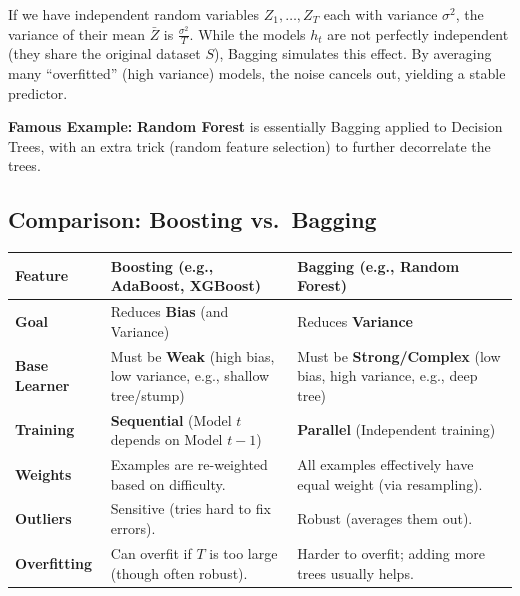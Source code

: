 \documentclass[
  italian,
  11pt,
]{article}
\newcounter{none} %
\begin{document}
If we have independent random variables \(Z_1, \dots, Z_T\) each with
variance \(\sigma^2\), the variance of their mean \(\bar{Z}\) is
\(\frac{\sigma^2}{T}\). While the models \(h_t\) are not perfectly
independent (they share the original dataset \(S\)), Bagging simulates
this effect. By averaging many ``overfitted'' (high variance) models,
the noise cancels out, yielding a stable predictor.

\textbf{Famous Example:} \textbf{Random Forest} is essentially Bagging
applied to Decision Trees, with an extra trick (random feature
selection) to further decorrelate the trees.

\subsection{Comparison: Boosting
vs.~Bagging}\label{comparison-boosting-vs.-bagging}

{\def\LTcaptype{none} %
\begin{longtable}[]{@{}
  >{\raggedright\arraybackslash}p{}
  >{\raggedright\arraybackslash}p{}
  >{\raggedright\arraybackslash}p{}@{}}
\toprule\noalign{}
\begin{minipage}[b]{\linewidth}\raggedright
Feature
\end{minipage} & \begin{minipage}[b]{\linewidth}\raggedright
\textbf{Boosting} (e.g., AdaBoost, XGBoost)
\end{minipage} & \begin{minipage}[b]{\linewidth}\raggedright
\textbf{Bagging} (e.g., Random Forest)
\end{minipage} \\
\midrule\noalign{}
\endhead
\bottomrule\noalign{}
\endlastfoot
\textbf{Goal} & Reduces \textbf{Bias} (and Variance) & Reduces
\textbf{Variance} \\
\textbf{Base Learner} & Must be \textbf{Weak} (high bias, low variance,
e.g., shallow tree/stump) & Must be \textbf{Strong/Complex} (low bias,
high variance, e.g., deep tree) \\
\textbf{Training} & \textbf{Sequential} (Model \(t\) depends on Model
\(t-1\)) & \textbf{Parallel} (Independent training) \\
\textbf{Weights} & Examples are re-weighted based on difficulty. & All
examples effectively have equal weight (via resampling). \\
\textbf{Outliers} & Sensitive (tries hard to fix errors). & Robust
(averages them out). \\
\textbf{Overfitting} & Can overfit if \(T\) is too large (though often
robust). & Harder to overfit; adding more trees usually helps. \\
\end{longtable}
}
\end{document}
